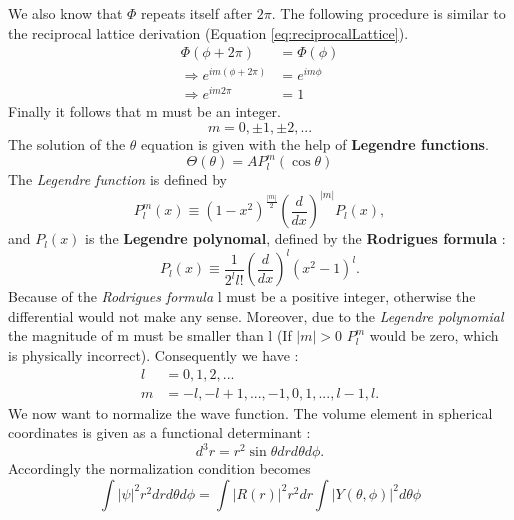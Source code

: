 			We also know that $\Phi$ repeats itself after $2 \pi$. The following procedure is similar to the reciprocal lattice derivation (Equation \ref{eq:reciprocalLattice}).
			\begin{equation}
				\begin{split}
					\Phi(\phi + 2 \pi) &= \Phi(\phi)  \\
					\Rightarrow e^{im(\phi + 2 \pi)} &= e^{im \phi} \\
					\Rightarrow e^{im 2\pi} &= 1
				\end{split}
			\end{equation}
			Finally it follows that m must be an integer.
			\begin{equation}
				m = 0, \pm 1, \pm 2, ...
			\end{equation}
			The solution of the $\theta$ equation is given with the help of \textbf{Legendre functions}.
			\begin{equation}
				\Theta (\theta) = A P_l^m (\cos \theta)
			\end{equation}
			The \textit{Legendre function} is defined by
			\begin{equation}
				P_l^m (x) \equiv (1 -x^2)^{\frac{|m|}{2}} \left( \frac{d}{dx} \right)^{|m|} P_l(x),
			\end{equation}
			and $P_l(x)$ is the \textbf{Legendre polynomal}, defined by the \textbf{Rodrigues formula} :
			\begin{equation}
				P_l(x) \equiv \frac{1}{2^l l!} \left( \frac{d}{dx} \right)^l (x^2 - 1)^l .
			\end{equation}
			 Because of the \textit{Rodrigues formula} l must be a positive integer, otherwise the differential would not make any sense. Moreover, due to the \textit{Legendre polynomial} the magnitude of m must be smaller than l (If $|m| > 0$ $P_l^m$ would be zero, which is physically incorrect). Consequently we have :
			\begin{align}
				l &= 0,1,2, ... \\
				m &= -l, -l+1, ..., -1, 0, 1, ..., l-1, l.
			\end{align} 
			We now want to normalize the wave function. The volume element in spherical coordinates is given as a functional determinant :
			\begin{equation}
				d^3 r = r^2 \sin \theta dr d \theta d \phi.
			\end{equation}
			Accordingly the normalization condition becomes 
			\begin{equation}
				\int |\psi|^2 r^2 dr d \theta d \phi = \int |R(r)|^2 r^2 dr \int |Y(\theta, \phi)|^2 d \theta \phi 
			\end{equation}
